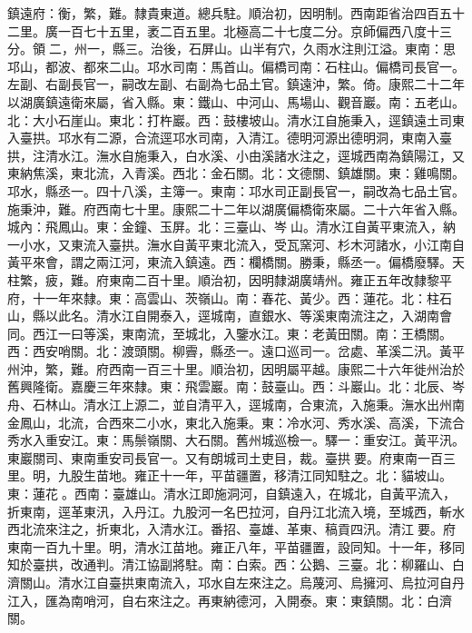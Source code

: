 \begin{pinyinscope}
鎮遠府：衡，繁，難。隸貴東道。總兵駐。順治初，因明制。西南距省治四百五十二里。廣一百七十五里，袤二百五里。北極高二十七度二分。京師偏西八度十三分。領二，州一，縣三。治後，石屏山。山半有穴，久雨水注則江溢。東南：思邛山，都波、都來二山。邛水司南：馬首山。偏橋司南：石柱山。偏橋司長官一。左副、右副長官一，嗣改左副、右副為七品土官。鎮遠沖，繁。倚。康熙二十二年以湖廣鎮遠衛來屬，省入縣。東：鐵山、中河山、馬場山、觀音巖。南：五老山。北：大小石崖山。東北：打杵巖。西：鼓樓坡山。清水江自施秉入，逕鎮遠土司東入臺拱。邛水有二源，合流逕邛水司南，入清江。德明河源出德明洞，東南入臺拱，注清水江。潕水自施秉入，白水溪、小由溪諸水注之，逕城西南為鎮陽江，又東納焦溪，東北流，入青溪。西北：金石關。北：文德關、鎮雄關。東：雞鳴關。邛水，縣丞一。四十八溪，主簿一。東南：邛水司正副長官一，嗣改為七品土官。施秉沖，難。府西南七十里。康熙二十二年以湖廣偏橋衛來屬。二十六年省入縣。城內：飛鳳山。東：金鐘、玉屏。北：三臺山、岑山。清水江自黃平東流入，納一小水，又東流入臺拱。潕水自黃平東北流入，受瓦窯河、杉木河諸水，小江南自黃平來會，謂之兩江河，東流入鎮遠。西：欄橋關。勝秉，縣丞一。偏橋廢驛。天柱繁，疲，難。府東南二百十里。順治初，因明隸湖廣靖州。雍正五年改隸黎平府，十一年來隸。東：高雲山、茨嶺山。南：春花、黃少。西：蓮花。北：柱石山，縣以此名。清水江自開泰入，逕城南，直銀水、等溪東南流注之，入湖南會同。西江一曰等溪，東南流，至城北，入鑒水江。東：老黃田關。南：王橋關。西：西安哨關。北：渡頭關。柳霽，縣丞一。遠口巡司一。岔處、革溪二汛。黃平州沖，繁，難。府西南一百三十里。順治初，因明屬平越。康熙二十六年徙州治於舊興隆衛。嘉慶三年來隸。東：飛雲巖。南：鼓臺山。西：斗巖山。北：北辰、岑舟、石林山。清水江上源二，並自清平入，逕城南，合東流，入施秉。潕水出州南金鳳山，北流，合西來二小水，東北入施秉。東：冷水河、秀水溪、高溪，下流合秀水入重安江。東：馬鬃嶺關、大石關。舊州城巡檢一。驛一：重安江。黃平汛。東巖關司、東南重安司長官一。又有朗城司土吏目，裁。臺拱要。府東南一百三里。明，九股生苗地。雍正十一年，平苗疆置，移清江同知駐之。北：貓坡山。東：蓮花。西南：臺雄山。清水江即施洞河，自鎮遠入，在城北，自黃平流入，折東南，逕革東汛，入丹江。九股河一名巴拉河，自丹江北流入境，至城西，斬水西北流來注之，折東北，入清水江。番招、臺雄、革東、稿貢四汛。清江要。府東南一百九十里。明，清水江苗地。雍正八年，平苗疆置，設同知。十一年，移同知於臺拱，改通判。清江協副將駐。南：白索。西：公鵝、三臺。北：柳羅山、白濟關山。清水江自臺拱東南流入，邛水自左來注之。烏蔑河、烏擁河、烏拉河自丹江入，匯為南哨河，自右來注之。再東納德河，入開泰。東：東鎮關。北：白濟關。


\end{pinyinscope}
